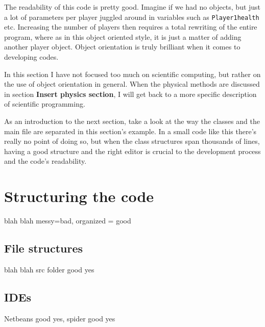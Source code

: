 The readability of this code is pretty good. Imagine if we had no objects, but just a lot of parameters per player juggled around in variables such as \verb+Player1health+ etc. Increasing the number of players then requires a total rewriting of the entire program, where as in this object oriented style, it is just a matter of adding another player object. Object orientation is truly brilliant when it comes to developing codes. 

In this section I have not focused too much on scientific computing, but rather on the use of object orientation in general. When the physical methods are discussed in section \textbf{Insert physics section}, I will get back to a more specific description of scientific programming.

As an introduction to the next section, take a look at the way the classes and the main file are separated in this section's example. In a small code like this there's really no point of doing so, but when the class structures span thousands of lines, having a good structure and the right editor is crucial to the development process and the code's readability.


\section{Structuring the code}

blah blah messy=bad, organized = good

\subsection{File structures}

blah blah src folder good yes

\subsection{IDEs}

Netbeans good yes, spider good yes